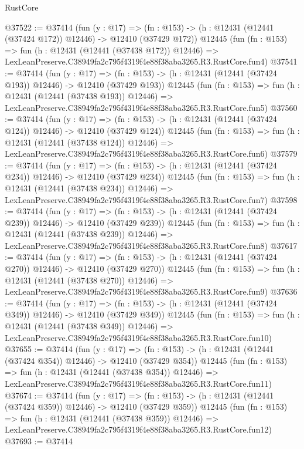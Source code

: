 \begin{lexlean}{RustCore}
\begin{coremodule}
@37522 := @37414
    (fun (y : @17) =>
    (fn : @153) -> (h : @12431 (@12441 (@37424 @172)) @12446) -> @12410 (@37429 @172))
    @12445
    (fun (fn : @153) =>
    fun (h : @12431 (@12441 (@37438 @172)) @12446) =>
    LexLeanPreserve.C38949fa2c795f4319f4e88f38aba3265.R3.RustCore.fun4)
@37541 := @37414
    (fun (y : @17) =>
    (fn : @153) -> (h : @12431 (@12441 (@37424 @193)) @12446) -> @12410 (@37429 @193))
    @12445
    (fun (fn : @153) =>
    fun (h : @12431 (@12441 (@37438 @193)) @12446) =>
    LexLeanPreserve.C38949fa2c795f4319f4e88f38aba3265.R3.RustCore.fun5)
@37560 := @37414
    (fun (y : @17) =>
    (fn : @153) -> (h : @12431 (@12441 (@37424 @124)) @12446) -> @12410 (@37429 @124))
    @12445
    (fun (fn : @153) =>
    fun (h : @12431 (@12441 (@37438 @124)) @12446) =>
    LexLeanPreserve.C38949fa2c795f4319f4e88f38aba3265.R3.RustCore.fun6)
@37579 := @37414
    (fun (y : @17) =>
    (fn : @153) -> (h : @12431 (@12441 (@37424 @234)) @12446) -> @12410 (@37429 @234))
    @12445
    (fun (fn : @153) =>
    fun (h : @12431 (@12441 (@37438 @234)) @12446) =>
    LexLeanPreserve.C38949fa2c795f4319f4e88f38aba3265.R3.RustCore.fun7)
@37598 := @37414
    (fun (y : @17) =>
    (fn : @153) -> (h : @12431 (@12441 (@37424 @239)) @12446) -> @12410 (@37429 @239))
    @12445
    (fun (fn : @153) =>
    fun (h : @12431 (@12441 (@37438 @239)) @12446) =>
    LexLeanPreserve.C38949fa2c795f4319f4e88f38aba3265.R3.RustCore.fun8)
@37617 := @37414
    (fun (y : @17) =>
    (fn : @153) -> (h : @12431 (@12441 (@37424 @270)) @12446) -> @12410 (@37429 @270))
    @12445
    (fun (fn : @153) =>
    fun (h : @12431 (@12441 (@37438 @270)) @12446) =>
    LexLeanPreserve.C38949fa2c795f4319f4e88f38aba3265.R3.RustCore.fun9)
@37636 := @37414
    (fun (y : @17) =>
    (fn : @153) -> (h : @12431 (@12441 (@37424 @349)) @12446) -> @12410 (@37429 @349))
    @12445
    (fun (fn : @153) =>
    fun (h : @12431 (@12441 (@37438 @349)) @12446) =>
    LexLeanPreserve.C38949fa2c795f4319f4e88f38aba3265.R3.RustCore.fun10)
@37655 := @37414
    (fun (y : @17) =>
    (fn : @153) -> (h : @12431 (@12441 (@37424 @354)) @12446) -> @12410 (@37429 @354))
    @12445
    (fun (fn : @153) =>
    fun (h : @12431 (@12441 (@37438 @354)) @12446) =>
    LexLeanPreserve.C38949fa2c795f4319f4e88f38aba3265.R3.RustCore.fun11)
@37674 := @37414
    (fun (y : @17) =>
    (fn : @153) -> (h : @12431 (@12441 (@37424 @359)) @12446) -> @12410 (@37429 @359))
    @12445
    (fun (fn : @153) =>
    fun (h : @12431 (@12441 (@37438 @359)) @12446) =>
    LexLeanPreserve.C38949fa2c795f4319f4e88f38aba3265.R3.RustCore.fun12)
@37693 := @37414

\end{coremodule}
\end{lexlean}
